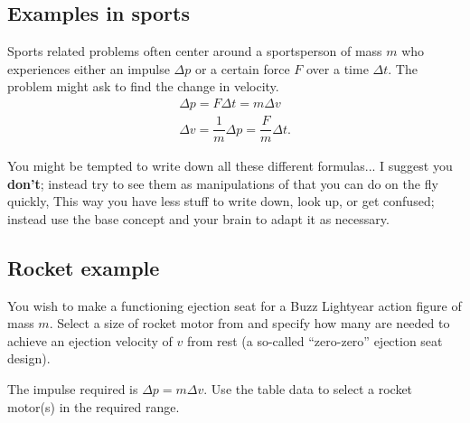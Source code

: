 \documentclass[handout]{tufte-handout}
\begin{document}
\subsection{Examples in sports}
Sports related problems often center around a sportsperson of mass $m$ who experiences either an impulse $\Delta p$ or a certain force $F$ over a time $\Delta t$. The problem might ask to find the change in velocity.
\begin{align}
\Delta p = F \Delta t = m \Delta v \\
\Delta v = \dfrac{1}{m} \Delta p = \dfrac{F}{m} \Delta t.
\end{align}

You might be tempted to write down all these different formulas... I suggest you \textbf{don't}; instead try to see them as manipulations of  that you can do on the fly quickly, This way you have less stuff to write down, look up, or get confused; instead use the base concept and your brain to adapt it as necessary. 



\subsection{Rocket example}
You wish to make a functioning ejection seat for a Buzz Lightyear action figure of mass $m$. Select a size of rocket motor from  and specify how many are needed to achieve an ejection velocity of $v$ from rest (a so-called ``zero-zero'' ejection seat design). 

The impulse required is $\Delta p = m \Delta v$. Use the table data to select a rocket motor(s) in the required range. 
\end{document}
